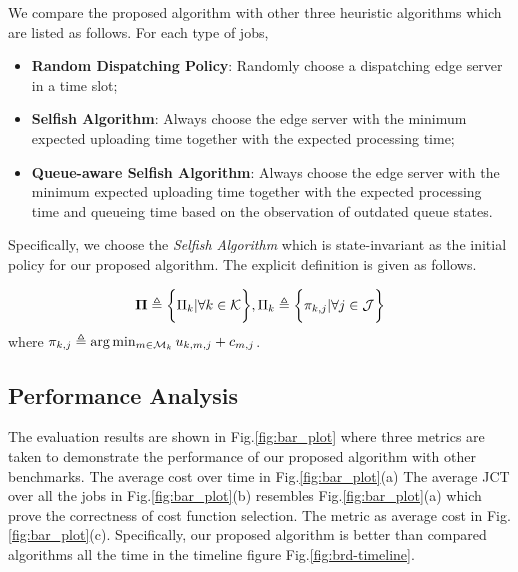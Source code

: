 We compare the proposed algorithm with other three heuristic algorithms which are listed as follows. For each type of jobs,
\begin{itemize}
    \item \textbf{Random Dispatching Policy}:
            Randomly choose a dispatching edge server in a time slot; 
    \item \textbf{Selfish Algorithm}:
            Always choose the edge server with the minimum expected uploading time together with the expected processing time;
    \item \textbf{Queue-aware Selfish Algorithm}:
            Always choose the edge server with the minimum expected uploading time together with the expected processing time and queueing time based on the observation of outdated queue states.
\end{itemize}
Specifically, we choose the \emph{Selfish Algorithm} which is state-invariant as the initial policy for our proposed algorithm.
The explicit definition is given as follows.
\begin{policy}
    \begin{align}
        \boldsymbol{\Pi} \triangleq \bigg\{ \Pi_{k} |\forall k\in\mathcal{K} \bigg\}, \Pi_{k} \triangleq \bigg\{{\pi_{k,j}|\forall j\in\mathcal{J}}\bigg\}
    \end{align}
    where $\pi_{k,j} \triangleq \arg\min_{m\in\mathcal{M}_{k}} u_{k,m,j} + c_{m,j}$.
\end{policy}

\subsection{Performance Analysis}
\label{subsec:basic}
The evaluation results are shown in Fig.\ref{fig:bar_plot} where three metrics are taken to demonstrate the performance of our proposed algorithm with other benchmarks.
The average cost over time in Fig.\ref{fig:bar_plot}(a)
The average JCT over all the jobs in Fig.\ref{fig:bar_plot}(b) resembles Fig.\ref{fig:bar_plot}(a) which prove the correctness of cost function selection.
The metric as average cost in Fig.\ref{fig:bar_plot}(c).
Specifically, our proposed algorithm is better than compared algorithms all the time in the timeline figure Fig.\ref{fig:brd-timeline}.

